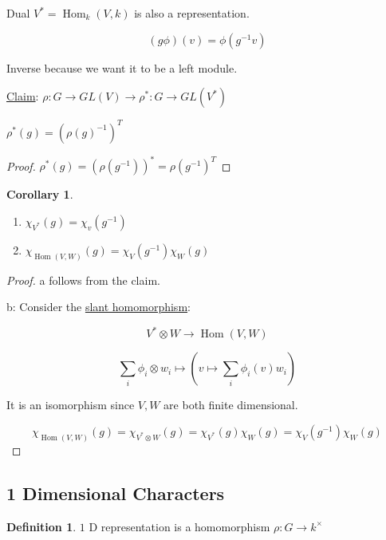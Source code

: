 \documentclass{article}
\theoremstyle{definition}
\newtheorem*{definition}{Definition}
\newtheorem{corollary}[theorem]{Corollary}
\newcommand{\Hom}{\operatorname{Hom}}
\begin{document}
Dual \(V^{\ast} = \Hom_k (V,k)\) is also a representation.

\[
    (g\phi)(v) = \phi(g ^{-1} v)
\]

Inverse because we want it to be a left module.

\underline{Claim}: \(\rho: G \to GL(V) \to \rho ^{\ast} : G \to GL(V^{\ast})\)

\(\rho ^{\ast} (g) = (\rho (g)^{-1})^T\) 

\begin{proof}
    \(\rho ^{\ast} (g) = (\rho (g ^{-1}))^{\ast} = \rho (g ^{-1})^T\) 
\end{proof}

\begin{corollary}
    \begin{enumerate}[label=\alph*)]
        \item \(\chi _{V^{\ast} }(g) = \chi _v(g ^{-1})\) 
        \item \(\chi_{\Hom(V,W)}(g) = \chi _V (g ^{-1}) \chi _W(g)\)  
    \end{enumerate} 
\end{corollary}

\begin{proof}
    a follows from the claim.

    b: Consider the \underline{slant homomorphism}:

    \[
        V^{\ast} \otimes W \to \Hom(V,W)
    \]

    \[
        \sum_{i} \phi_i \otimes w_i \mapsto \left(v \mapsto \sum_{i} \phi _i(v)w_i \right)
    \]

    It is an isomorphism since \(V,W\) are both finite dimensional.

    \[
        \chi_{\Hom(V,W)} (g) = \chi_{V^{\ast} \otimes W} (g) = \chi_{V^{\ast}}(g) \chi_W(g) = \chi_V(g ^{-1}) \chi _W(g)
    \]
\end{proof}

\subsection*{1 Dimensional Characters}

\begin{definition}
    \(1\) D representation is a homomorphism \(\rho: G \to k^\times \) 
\end{definition}

\begin{center}
\end{center}
\end{document}
